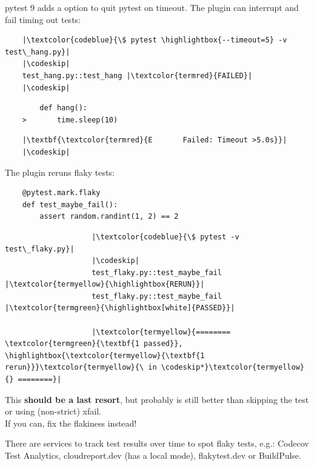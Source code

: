 pytest 9 adds a  option to quit pytest on timeout. The  plugin can interrupt and fail timing out tests:

\begin{verbatim}
    |\textcolor{codeblue}{\$ pytest \highlightbox{--timeout=5} -v test\_hang.py}|
    |\codeskip|
    test_hang.py::test_hang |\textcolor{termred}{FAILED}|
    |\codeskip|
\end{verbatim}
\vspace{-2em}
\begin{verbatim}
        def hang():
    >       time.sleep(10)
\end{verbatim}
\vspace{-2em}
\begin{verbatim}
    |\textbf{\textcolor{termred}{E       Failed: Timeout >5.0s}}|
    |\codeskip|
\end{verbatim}

\vspace{-1em}

The  plugin reruns flaky tests:

\begin{verbatim}
    @pytest.mark.flaky
    def test_maybe_fail():
        assert random.randint(1, 2) == 2
\end{verbatim}

\begin{verbatim}
                    |\textcolor{codeblue}{\$ pytest -v test\_flaky.py}|
                    |\codeskip|
                    test_flaky.py::test_maybe_fail |\textcolor{termyellow}{\highlightbox{RERUN}}|
                    test_flaky.py::test_maybe_fail |\textcolor{termgreen}{\highlightbox[white]{PASSED}}|

                    |\textcolor{termyellow}{======== \textcolor{termgreen}{\textbf{1 passed}}, \highlightbox{\textcolor{termyellow}{\textbf{1 rerun}}}\textcolor{termyellow}{\ in \codeskip*}\textcolor{termyellow}{} ========}|
                \end{verbatim}

This \textbf{should be a last resort}, but probably is still better than skipping the test or using (non-strict) xfail. \\
If you can, fix the flakiness instead!

There are services to track test results over time to spot flaky tests, e.g.:
Codecov Test Analytics, cloudreport.dev (has a local mode), flakytest.dev or BuildPulse.
